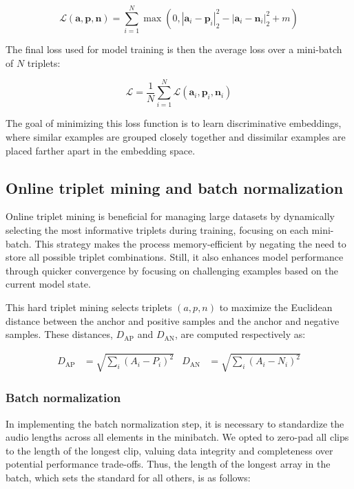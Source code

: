 \begin{equation}
\mathcal{L}(\mathbf{a}, \mathbf{p}, \mathbf{n}) = \sum_{i=1}^{N} \max \left(0, \left| \mathbf{a}_i - \mathbf{p}_i \right|_2^2 - \left| \mathbf{a}_i - \mathbf{n}_i \right|_2^2 + m \right)
\end{equation}

The final loss used for model training is then the average loss over a mini-batch of $N$ triplets:

\begin{equation}
\mathcal{L} = \frac{1}{N} \sum_{i=1}^{N} \mathcal{L}(\mathbf{a}_i, \mathbf{p}_i, \mathbf{n}_i)
\end{equation}

The goal of minimizing this loss function is to learn discriminative embeddings, where similar examples are grouped closely together and dissimilar examples are placed farther apart in the embedding space.

\subsection{Online triplet mining and batch normalization}

Online triplet mining is beneficial for managing large datasets by dynamically selecting the most informative triplets during training, focusing on each mini-batch. This strategy makes the process memory-efficient by negating the need to store all possible triplet combinations. Still, it also enhances model performance through quicker convergence by focusing on challenging examples based on the current model state.

This hard triplet mining selects triplets $(a, p, n)$ to maximize the Euclidean distance between the anchor and positive samples and the anchor and negative samples. These distances, $D_{\text{AP}}$ and $D_{\text{AN}}$, are computed respectively as:


\begin{align}
D_{\text{AP}} &= \sqrt{\sum_{i} (A_i - P_i)^2} & D_{\text{AN}} &= \sqrt{\sum_{i} (A_i - N_i)^2}
\end{align}


\subsubsection{Batch normalization}

In implementing the batch normalization step, it is necessary to standardize the audio lengths across all elements in the minibatch. We opted to zero-pad all clips to the length of the longest clip, valuing data integrity and completeness over potential performance trade-offs. Thus, the length of the longest array in the batch, which sets the standard for all others, is as follows:

